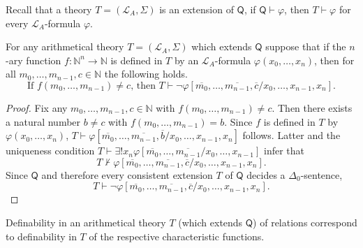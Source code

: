 Recall that a theory $T=(\mathcal{L}_A, \Sigma)$ is an extension of $\mathsf{Q}$, if $\mathsf{Q} \vdash \varphi$, then $T \vdash \varphi$ for every $\mathcal{L}_A$-formula $\varphi$.
\begin{lem}\label{lem:Tdefinable}
For any arithmetical theory $T = ( \mathcal{L}_A, \Sigma)$ which extends $\mathsf{Q}$ suppose that if the $n$-ary function $f: \mathbb{N}^n \rightarrow \mathbb{N}$ is defined in $T$ by an $\mathcal{L}_A$-formula $\varphi(x_0, \ldots, x_n)$, then for all $m_0, \ldots, m_{n-1}, c \in \mathbb{N}$ the following holds. \[\text{If } f(m_0, \ldots, m_{n-1}) \neq c\text{, then }T \vdash \lnot \varphi[\overline{m_0},\ldots, \overline{m_{n-1}}, \overline{c}/x_0,\ldots, x_{n-1}, x_{n}]. \]
\end{lem}
\begin{proof}
Fix any $m_0,\ldots, m_{n-1}, c \in \mathbb{N}$ with $f(m_0,\ldots, m_{n-1}) \neq c$. Then there exists a natural number $b \neq c$ with $f(m_0,\ldots, m_{n-1}) = b$. Since $f$ is defined in $T$ by $\varphi(x_0, \ldots, x_n)$, $T \vdash \varphi[\overline{m_0},\ldots, \overline{m_{n-1}}, \overline{b}/x_0,\ldots, x_{n-1}, x_{n}]$ follows. Latter and the uniqueness condition $T \vdash \exists ! x_n \varphi[\overline{m_0}, \ldots, \overline{m_{n-1}}/x_0, \ldots, x_{n-1}]$ infer that \[T \nvdash \varphi [\overline{m_0}, \ldots, \overline{m_{n-1}}, \overline{c}/x_0, \ldots, x_{n-1},x_n].\] Since $\mathsf{Q}$ and therefore every consistent extension $T$ of $\mathsf{Q}$ decides a $\Delta_0$-sentence,
\[T \vdash \lnot \varphi [\overline{m_0}, \ldots, \overline{m_{n-1}}, \overline{c}/x_0, \ldots, x_{n-1},x_n].\]
\end{proof}


Definability in an arithmetical theory $T$ (which extends $\mathsf{Q}$) of relations correspond to definability in $T$ of the respective characteristic functions.

